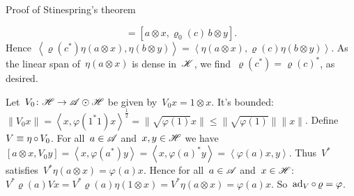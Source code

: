 \documentclass[b]{subfiles}
\begin{document}
\begin{parsec}
\begin{point}
\begin{point}{Proof of Stinespring's theorem }
\begin{point}
\begin{equation*}
        = [a\otimes x,\varrho_0(c)\, b \otimes y].
    \end{equation*}
Hence~$
    \left<\varrho(c^*) \eta(a\otimes x), \eta(b\otimes y)\right>=
    \left< \eta(a\otimes x), \varrho(c)\eta(b\otimes y)\right>$.
    As the linear span of~$\eta(a\otimes x)$ is dense in~$\mathscr{K}$,
        we find~$\varrho(c^*) = \varrho(c)^*$, as desired.
\end{point}
\begin{point}%
    Let~$V_0 \colon \mathscr{H} \to \mathscr{A} \odot \mathscr{H}$
        be given by~$V_0 x = 1 \otimes x$.
        It's bounded: $\| V_0 x\| = \left<x, \varphi(1^*1) x\right>^{\frac{1}{2}}
        = \|\sqrt{\varphi(1)} x\| \leq \|\sqrt{\varphi(1)}\| \|x\|$.
    Define~$V \equiv \eta \mathop{\circ} V_0$.
    For all~$a \in \mathscr{A}$ and~$x,y \in \mathscr{H}$ we have
            $[a \otimes x, V_0 y]
            = \left<x, \varphi(a^*)y\right>
            = \left<x, \varphi(a)^*y\right>
            = \left<\varphi(a) x, y\right>$.
    Thus~$V^*$ satisfies~$V^* \eta(a \otimes x) = \varphi(a)x$.
    Hence for all~$a \in \mathscr{A}$ and~$x \in \mathscr{H}$:
    $V^* \varrho(a) V x = V^* \varrho(a) \eta(1 \otimes x)
        = V^* \eta(a\otimes x)
        = \varphi(a)x$.
        So~$\mathrm{ad}_V \mathop{\circ} \varrho = \varphi$.


\end{point}
\end{point}
\end{point}
\end{parsec}
\end{document}
